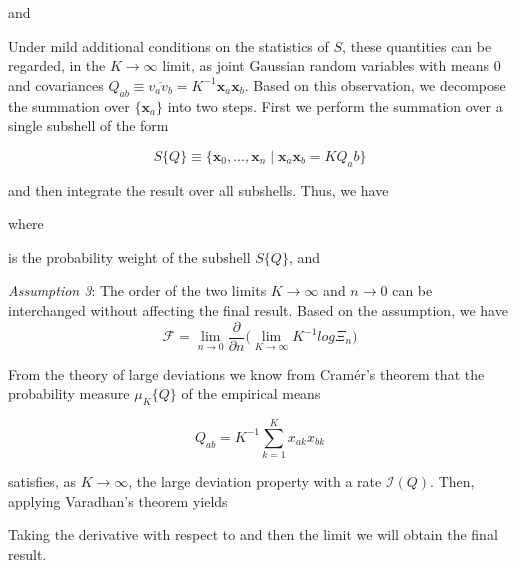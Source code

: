 \documentclass[letterpaper,english,10pt]{article}
\begin{document}
and


Under mild additional conditions on the statistics of $S$, these quantities can be regarded, in the $K \to \infty$ limit, as joint Gaussian random variables with means $0$ and covariances $Q_{ab} \equiv \overline{v_av_b} = K^{-1}\textbf{x}_a\textbf{x}_b$. Based on this observation, we decompose the summation over $\{\textbf{x}_a\}$ into two steps. First we perform the summation over a single subshell of the form

$$S\{Q\} \equiv \{\textbf{x}_0, . . . , \textbf{x}_n \mid \textbf{x}_a\textbf{x}_b = KQ_ab\}$$

and then integrate the result over all subshells. Thus, we have


where


is the probability weight of the subshell $S\{Q\}$, and


\textit{Assumption 3}: The order of the two limits $K \to \infty$ and $n \to 0$ can be interchanged without affecting the final result.
Based on the assumption, we have
$$\mathscr{F} = \lim_{n \to 0}\frac{\partial}{\partial n}\Bigg(\lim_{K \to \infty}K^{-1}log \Xi_n\Bigg)$$

From the theory of large deviations we know from Cramér’s theorem that the probability measure $\mu_K\{Q\}$ of the empirical means 

$$Q_{ab} = K^{-1} \sum_{k=1}^{K}x_{ak}x_{bk}$$

satisfies, as $K \to \infty$, the large deviation property with a rate $\mathscr{I}(Q)$. Then, applying Varadhan’s theorem yields

Taking the derivative with respect to and then the limit we will obtain the final result.
\end{document}
